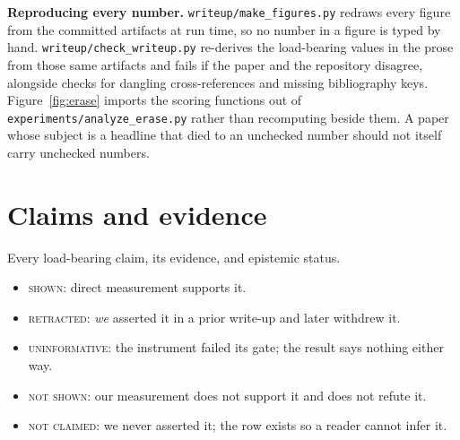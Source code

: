 \documentclass{article}
\begin{document}
\vspace{1.5em}
\noindent\textbf{Reproducing every number.} \texttt{writeup/make\_figures.py} redraws every figure
from the committed artifacts at run time, so no number in a figure is typed by hand.
\texttt{writeup/check\_writeup.py} re-derives the load-bearing values in the prose from those same
artifacts and fails if the paper and the repository disagree, alongside checks for dangling
cross-references and missing bibliography keys. Figure~\ref{fig:erase} imports the scoring
functions out of \texttt{experiments/analyze\_erase.py} rather than recomputing beside them. A
paper whose subject is a headline that died to an unchecked number should not itself carry
unchecked numbers.

\section{Claims and evidence}
\label{app:claims}

Every load-bearing claim, its evidence, and epistemic status.

\begin{itemize}\itemsep2pt
\item \textsc{shown}: direct measurement supports it.
\item \textsc{retracted}: \emph{we} asserted it in a prior write-up and later withdrew it.
\item \textsc{uninformative}: the instrument failed its gate; the result says nothing either way.
\item \textsc{not shown}: our measurement does not support it and does not refute it.
\item \textsc{not claimed}: we never asserted it; the row exists so a reader cannot infer it.
\end{itemize}
\end{document}

